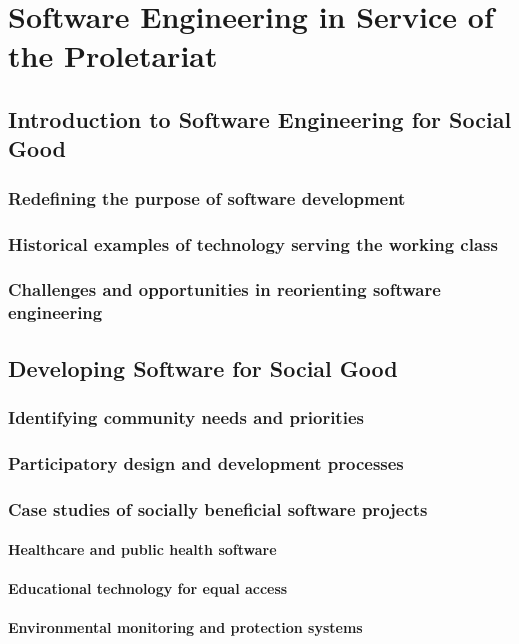 \chapter{Software Engineering in Service of the Proletariat}

\section{Introduction to Software Engineering for Social Good}
\subsection{Redefining the purpose of software development}
\subsection{Historical examples of technology serving the working class}
\subsection{Challenges and opportunities in reorienting software engineering}

\newpage

\section{Developing Software for Social Good}
\subsection{Identifying community needs and priorities}
\subsection{Participatory design and development processes}
\subsection{Case studies of socially beneficial software projects}
\subsubsection{Healthcare and public health software}
\subsubsection{Educational technology for equal access}
\subsubsection{Environmental monitoring and protection systems}
